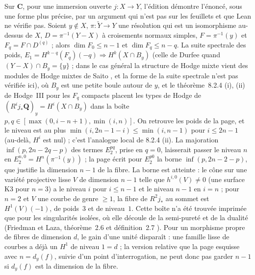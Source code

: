 {\small Sur $\mathbf C$, pour une immersion ouverte $j : X \to Y$, l'édition démontre l'énoncé, sous une forme plus précise, par un argument qui n'est pas sur les feuillets et que Lean ne vérifie pas. Soient $y \notin X$, $\pi : \tilde Y \to Y$ une résolution qui est un isomorphisme au-dessus de $X$, $D = \pi^{-1}(Y - X)$ à croisements normaux simples, $F = \pi^{-1}(y)$ et $F_q = F \cap D^{(q)}$ ; alors $\dim F_0 \leq n - 1$ et $\dim F_q \leq n - q$. La suite spectrale des poids, $E_1 = H^{k-q}(F_q)(-q) \Rightarrow H^k(X \cap B_y)$ (celle de Durfee \cite{durfee1983} quand $(Y - X) \cap B_y = \{y\}$ ; dans le cas général la structure de Hodge mixte vient des modules de Hodge mixtes de Saito \cite{saito1990}, et la forme de la suite spectrale n'est pas vérifiée ici), où $B_y$ est une petite boule autour de $y$, et le théorème~8.2.4 (i), (ii) de Hodge~III \cite{deligne1974} pour les $F_q$ compacts placent les types de Hodge de $(R^i j_*\mathbf Q)_y = H^i(X \cap B_y)$ dans la boîte $p, q \in [\max(0, i - n + 1), \min(i, n)]$. On retrouve les poids de la page, et le niveau est au plus $\min(i, 2n - 1 - i) \leq \min(i, n - 1)$ pour $i \leq 2n - 1$ (au-delà, $H^i$ est nul) ; c'est l'analogue local de 8.2.4 (ii). La majoration $\inf(p, 2n - 2q - p)$ des termes $E_2^{pq}$, prise en $q = 0$, laisserait passer le niveau $n$ en $E_2^{n,0} = H^n(\pi^{-1}(y))$ ; la page écrit pour $E_2^{p0}$ la borne $\inf(p, 2n - 2 - p)$, que justifie la dimension $n - 1$ de la fibre. La borne est atteinte : le cône sur une variété projective lisse $V$ de dimension $n - 1$ telle que $h^{i,0}(V) \neq 0$ (une surface K3 pour $n = 3$) a le niveau $i$ pour $i \leq n - 1$ et le niveau $n - 1$ en $i = n$ ; pour $n = 2$ et $V$ une courbe de genre $\geq 1$, la fibre de $R^2 j_*$ au sommet est $H^1(V)(-1)$, de poids~$3$ et de niveau~$1$. Cette boîte n'a été trouvée imprimée que pour les singularités isolées, où elle découle de la semi-pureté et de la dualité (Friedman et Laza, théorème~2.6 et définition~2.7 \cite{friedmanlaza}). Pour un morphisme propre de fibres de dimension $d$, le gain d'une unité disparaît : une famille lisse de courbes a déjà un $H^1$ de niveau $1 = d$ ; la version relative que la page esquisse avec $n = d_y(f)$, suivie d'un point d'interrogation, ne peut donc pas garder $n - 1$ si $d_y(f)$ est la dimension de la fibre.\par}

